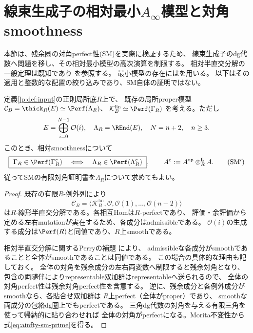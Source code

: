 \section{線束生成子の相対最小$A_\infty$模型と対角smoothness}
\label{sec:minimal-ainfty}
本節は、残余圏の対角perfect性(SM)を実際に検証するため、
線束生成子のdg代数へ問題を移し、その相対最小模型の高次演算を制限する。
相対半直交分解の一般定理は既知であり
\cite[Lemma~4.15(3)]{AinftyPerry2019}を参照する。
最小模型の存在には\cite{PetersenTransfer,BurkeTransfer}を用いる。
以下はその適用と整数的な配置の絞り込みであり、SM自体の証明ではない。

\begin{theorem}[残余対角と線束生成子の対角]
\label{thm:ainfty-smooth-equiv}
定義\ref{lp:def:input}の正則局所底$R$上で、
既存の局所proper模型
$\mathcal C_B=\thick_R(E)\simeq\Perf(\Lambda_R)$、
$\mathcal K_B^{\mathrm{lin}}\simeq\Perf(\Gamma_R)$
を考える。ただし
\[
 E=\bigoplus_{i=0}^{N-1}\mathcal O(i),\quad
 \Lambda_R=\REnd(E),\quad N=n+2,\quad n\ge3.
\]
このとき、相対smoothnessについて
\[
 \boxed{\ \Gamma_R\in\Perf(\Gamma_R^e)
 \quad\Longleftrightarrow\quad
 \Lambda_R\in\Perf(\Lambda_R^e)\ },\qquad
 A^e:=A^{\mathrm{op}}\otimes_R^{\mathbf L}A.
 \tag{SM$'$}\label{eq:ainfty-sm-prime}
\]
従ってSMの有限対角証明書を$\Lambda_R$について求めてもよい。
\end{theorem}
\begin{proof}
既存の有限$R$-例外列により
\[
 \mathcal C_B=
 \langle\mathcal K_B^{\mathrm{lin}},
 \mathcal O,\mathcal O(1),\ldots,\mathcal O(n-2)\rangle
\]
は$R$-線形半直交分解である。各相互Homは$R$-perfectであり、
評価・余評価から定める左右mutationが実在するため、各成分はadmissibleである。
$\mathcal O(i)$の生成する成分は$\Perf(R)$と同値であり、$R$上smoothである。

相対半直交分解に関するPerryの補題
\cite[Lemma~4.15(3)]{AinftyPerry2019}により、
admissibleな各成分がsmoothであることと全体がsmoothであることは同値である。
この場合の具体的な理由も記しておく。
全体の対角を残余成分の左右両変数へ制限すると残余対角となり、
包含の両随伴によりrepresentable双加群はrepresentableへ送られるので、
全体の対角perfect性は残余対角perfect性を含意する。
逆に、残余成分と各例外成分がsmoothなら、各貼合せ双加群は
$R$上perfect（全体がproper）であり、
smoothな両成分の包絡dg圏上でもperfectである。
三角dg代数の対角を与える有限三角を使って帰納的に貼り合わせれば
全体の対角がperfectになる。Morita不変性から式\eqref{eq:ainfty-sm-prime}を得る。
\end{proof}

